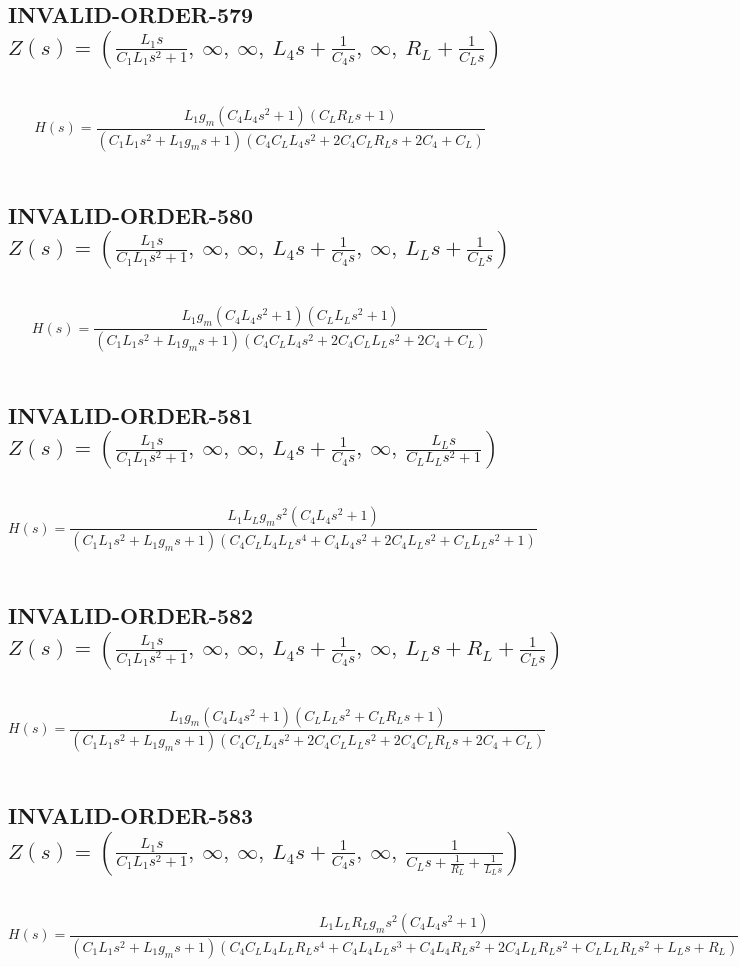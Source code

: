 \documentclass{article}
\begin{document}
\subsection{INVALID-ORDER-579 $Z(s) = \left( \frac{L_{1} s}{C_{1} L_{1} s^{2} + 1}, \  \infty, \  \infty, \  L_{4} s + \frac{1}{C_{4} s}, \  \infty, \  R_{L} + \frac{1}{C_{L} s}\right)$ } \ 
\textbf{\[H(s) = \frac{L_{1} g_{m} \left(C_{4} L_{4} s^{2} + 1\right) \left(C_{L} R_{L} s + 1\right)}{\left(C_{1} L_{1} s^{2} + L_{1} g_{m} s + 1\right) \left(C_{4} C_{L} L_{4} s^{2} + 2 C_{4} C_{L} R_{L} s + 2 C_{4} + C_{L}\right)}\] } \ 
\subsection{INVALID-ORDER-580 $Z(s) = \left( \frac{L_{1} s}{C_{1} L_{1} s^{2} + 1}, \  \infty, \  \infty, \  L_{4} s + \frac{1}{C_{4} s}, \  \infty, \  L_{L} s + \frac{1}{C_{L} s}\right)$ } \ 
\textbf{\[H(s) = \frac{L_{1} g_{m} \left(C_{4} L_{4} s^{2} + 1\right) \left(C_{L} L_{L} s^{2} + 1\right)}{\left(C_{1} L_{1} s^{2} + L_{1} g_{m} s + 1\right) \left(C_{4} C_{L} L_{4} s^{2} + 2 C_{4} C_{L} L_{L} s^{2} + 2 C_{4} + C_{L}\right)}\] } \ 
\subsection{INVALID-ORDER-581 $Z(s) = \left( \frac{L_{1} s}{C_{1} L_{1} s^{2} + 1}, \  \infty, \  \infty, \  L_{4} s + \frac{1}{C_{4} s}, \  \infty, \  \frac{L_{L} s}{C_{L} L_{L} s^{2} + 1}\right)$ } \ 
\textbf{\[H(s) = \frac{L_{1} L_{L} g_{m} s^{2} \left(C_{4} L_{4} s^{2} + 1\right)}{\left(C_{1} L_{1} s^{2} + L_{1} g_{m} s + 1\right) \left(C_{4} C_{L} L_{4} L_{L} s^{4} + C_{4} L_{4} s^{2} + 2 C_{4} L_{L} s^{2} + C_{L} L_{L} s^{2} + 1\right)}\] } \ 
\subsection{INVALID-ORDER-582 $Z(s) = \left( \frac{L_{1} s}{C_{1} L_{1} s^{2} + 1}, \  \infty, \  \infty, \  L_{4} s + \frac{1}{C_{4} s}, \  \infty, \  L_{L} s + R_{L} + \frac{1}{C_{L} s}\right)$ } \ 
\textbf{\[H(s) = \frac{L_{1} g_{m} \left(C_{4} L_{4} s^{2} + 1\right) \left(C_{L} L_{L} s^{2} + C_{L} R_{L} s + 1\right)}{\left(C_{1} L_{1} s^{2} + L_{1} g_{m} s + 1\right) \left(C_{4} C_{L} L_{4} s^{2} + 2 C_{4} C_{L} L_{L} s^{2} + 2 C_{4} C_{L} R_{L} s + 2 C_{4} + C_{L}\right)}\] } \ 
\subsection{INVALID-ORDER-583 $Z(s) = \left( \frac{L_{1} s}{C_{1} L_{1} s^{2} + 1}, \  \infty, \  \infty, \  L_{4} s + \frac{1}{C_{4} s}, \  \infty, \  \frac{1}{C_{L} s + \frac{1}{R_{L}} + \frac{1}{L_{L} s}}\right)$ } \ 
\textbf{\[H(s) = \frac{L_{1} L_{L} R_{L} g_{m} s^{2} \left(C_{4} L_{4} s^{2} + 1\right)}{\left(C_{1} L_{1} s^{2} + L_{1} g_{m} s + 1\right) \left(C_{4} C_{L} L_{4} L_{L} R_{L} s^{4} + C_{4} L_{4} L_{L} s^{3} + C_{4} L_{4} R_{L} s^{2} + 2 C_{4} L_{L} R_{L} s^{2} + C_{L} L_{L} R_{L} s^{2} + L_{L} s + R_{L}\right)}\] } \ 
\end{document}
